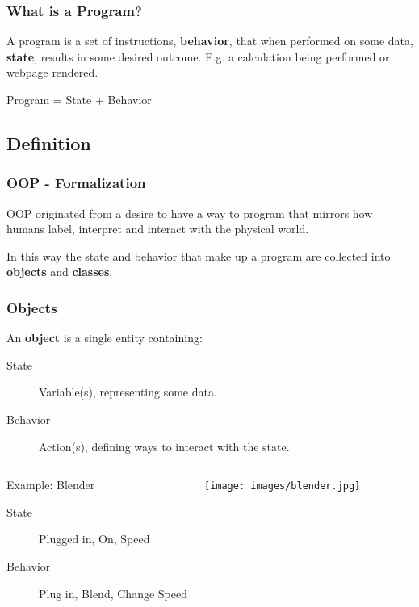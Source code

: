 \documentclass{beamer}
\begin{document}
\begin{frame}
  \frametitle{What is a Program?}
  A program is a set of instructions, \textbf{behavior}, that when performed on some data, \textbf{state}, results in some desired outcome. E.g. a calculation being performed or webpage rendered. \vspace{5mm}

  \begin{center}
  Program = State + Behavior
\end{center}
\end{frame}

\subsection{Definition}
\begin{frame}
  \frametitle{OOP - Formalization}
  OOP originated from a desire to have a way to program that mirrors how humans label, interpret and interact with the physical world. \vspace{4mm}

  In this way the state and behavior that make up a program are collected into \textbf{objects} and \textbf{classes}.
\end{frame}

\begin{frame}
  \frametitle{Objects}
  An \textbf{object} is a single entity containing: \vspace{4mm}

  \begin{description}
    \item[State] Variable(s), representing some data.
    \item[Behavior] Action(s), defining ways to interact with the state. 
  \end{description} \vspace{5mm}
  \pause
  
  \begin{columns}
    \begin{block}{Example: Blender}
      \begin{description}
        \item[State] Plugged in, On, Speed
        \item[Behavior] Plug in, Blend, Change Speed
      \end{description}
    \end{block}
      \vspace{3mm}
      \centering
      \texttt{[image: images/blender.jpg]}
    \end{columns}
\end{frame}
\end{document}
